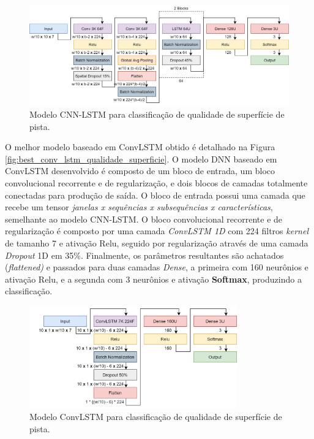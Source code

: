 \begin{figure}[h!]
  \centering
  \caption{Modelo CNN-LSTM para classificação de qualidade de superfície de pista.}
  \label{fig:best_cnn_lstm_qualidade_superficie}
  \includegraphics[width=1\textwidth]{figuras/fig_49.png}
\end{figure}

O melhor modelo baseado em ConvLSTM obtido é detalhado na Figura \autoref{fig:best_conv_lstm_qualidade_superficie}. O modelo DNN baseado em ConvLSTM desenvolvido é composto de um bloco de entrada, um bloco convolucional recorrente e de regularização, e dois blocos de camadas totalmente conectadas para produção de saída. O bloco de entrada possui uma camada que recebe um tensor \emph{janelas x sequências x subsequências x características}, semelhante ao modelo CNN-LSTM. O bloco convolucional recorrente e de regularização é composto por uma camada \textit{ConvLSTM 1D} com 224 filtros \textit{kernel} de tamanho 7 e ativação Relu, seguido por regularização através de uma camada \textit{Dropout} 1D em 35\%. Finalmente, os parâmetros resultantes são achatados (\textit{flattened)} e passados para duas camadas \textit{Dense}, a primeira com 160 neurônios e ativação Relu, e a segunda com 3 neurônios e ativação \textbf{Softmax}, produzindo a classificação.

\begin{figure}[ht!]
  \centering
  \caption{Modelo ConvLSTM para classificação de qualidade de superfície de pista.}
  \label{fig:best_conv_lstm_qualidade_superficie}
  \includegraphics[width=0.8\textwidth]{figuras/fig_50.png}
\end{figure}

